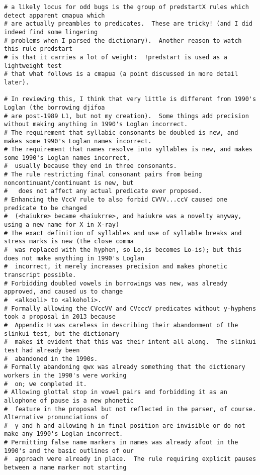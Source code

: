 \documentclass[12pt]{book}
\begin{document}
{\begin{verbatim}
# a likely locus for odd bugs is the group of predstartX rules which detect apparent cmapua which
# are actually preambles to predicates.  These are tricky! (and I did indeed find some lingering
# problems when I parsed the dictionary).  Another reason to watch this rule predstart
# is that it carries a lot of weight:  !predstart is used as a lightweight test
# that what follows is a cmapua (a point discussed in more detail later).

# In reviewing this, I think that very little is different from 1990's Loglan (the borrowing djifoa
# are post-1989 L1, but not my creation).  Some things add precision without making anything in 1990's Loglan incorrect.
# The requirement that syllabic consonants be doubled is new, and makes some 1990's Loglan names incorrect.
# The requirement that names resolve into syllables is new, and makes some 1990's Loglan names incorrect,
#  usually because they end in three consonants.
# The rule restricting final consonant pairs from being noncontinuant/continuant is new, but
#   does not affect any actual predicate ever proposed.
# Enhancing the VccV rule to also forbid CVVV...ccV caused one predicate to be changed
#  (<haiukre> became <haiukrre>, and haiukre was a novelty anyway, using a new name for X in X-ray)
# The exact definition of syllables and use of syllable breaks and stress marks is new (the close comma
#  was replaced with the hyphen, so Lo,is becomes Lo-is); but this does not make anything in 1990's Loglan
#  incorrect, it merely increases precision and makes phonetic transcript possible.
# Forbidding doubled vowels in borrowings was new, was already approved, and caused us to change
#  <alkooli> to <alkoholi>.
# Formally allowing the CVccVV and CVcccV predicates without y-hyphens took a proposal in 2013 because
#  Appendix H was careless in describing their abandonment of the slinkui test, but the dictionary
#  makes it evident that this was their intent all along.  The slinkui test had already been
#  abandoned in the 1990s.
# Formally abandoning qwx was already something that the dictionary workers in the 1990's were working
#  on; we completed it.
# Allowing glottal stop in vowel pairs and forbidding it as an allophone of pause is a new phonetic
#  feature in the proposal but not reflected in the parser, of course.   Alternative pronunciations of
#  y and h and allowing h in final position are invisible or do not make any 1990's Loglan incorrect.
# Permitting false name markers in names was already afoot in the 1990's and the basic outlines of our
#  approach were already in place.  The rule requiring explicit pauses between a name marker not starting

\end{verbatim}}
\end{document}

